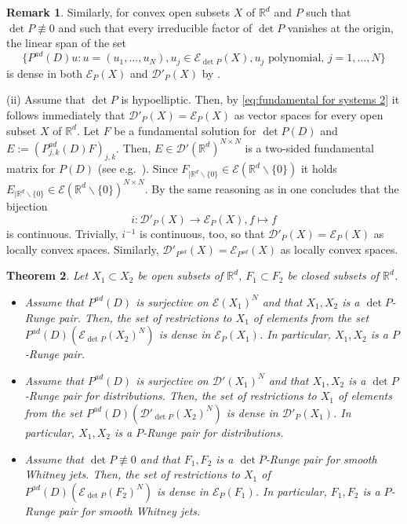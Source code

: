 \documentclass[a4paper,10pt]{amsart}
\newtheorem{theorem}{Theorem}
\newtheorem*{crucial lemma}{Lemma \ref{lem:nice polynomial2}}
\theoremstyle{definition}
\newtheorem{remark}[theorem]{Remark}
\newcommand{\R}{\mathbb{R}}
\newcommand{\Pad}{P^{ad}}
\newcommand{\detP}{\operatorname{det}\!P}
\begin{document}
\begin{remark}
	Similarly, for convex open subsets $X$ of $\R^d$ and $P$ such that $\detP\not\equiv 0$ and such that every irreducible factor of $\detP$ vanishes at the origin, the linear span of the set
	\begin{equation}\label{eq:exponential solutions}
		\{\Pad(D)u \colon u=(u_1,\ldots,u_N), u_j\in\mathscr{E}_{\detP}(X), u_j\text{ polynomial, } j=1,\ldots, N \}
	\end{equation}
	is dense in both $\mathscr{E}_P(X)$ and $\mathscr{D}'_P(X)$ by \cite[Chapitre Premiere, \S 2, Th\'eor\`eme 2']{Malgrange1955}.
	
	(ii) Assume that $\detP$ is hypoelliptic. Then, by \eqref{eq:fundamental for systems 2} it follows immediately that $\mathscr{D}'_P(X)=\mathscr{E}_P(X)$ as vector spaces for every open subset $X$ of $\R^d$. Let $F$ be a fundamental solution for $\detP(D)$ and $E:=(\Pad_{j,k}(D)F)_{j,k}$. Then, $E\in\mathscr{D}'(\R^d)^{N\times N}$ is a two-sided fundamental matrix for $P(D)$ (see e.g.~\cite[Section 2.1]{OrtnerWagner2015}). Since $F_{|\R^d\backslash\{0\}}\in\mathscr{E}(\R^d\backslash\{0\})$ it holds $E_{|\R^d\backslash\{0\}}\in\mathscr{E}(\R^d\backslash\{0\})^{N\times N}$. By the same reasoning as in \cite[Proof of Theorem 4.4.2]{Hor1} one concludes that the bijection
	\[i:\mathscr{D}'_P(X)\rightarrow\mathscr{E}_P(X), f\mapsto f\]
	is continuous. Trivially, $i^{-1}$ is continuous, too, so that $\mathscr{D}'_P(X)=\mathscr{E}_P(X)$ as locally convex spaces. Similarly, $\mathscr{D}'_{\Pad}(X)=\mathscr{E}_{\Pad}(X)$ as locally convex spaces.
\end{remark}

\begin{theorem}\label{theo:Runge for systems}
	Let $X_1\subset X_2$ be open subsets of $\R^d$, $F_1\subset F_2$ be closed subsets of $\R^d$.
	\begin{itemize}
		\item[(i)] Assume that $\Pad(D)$ is surjective on $\mathscr{E}(X_1)^N$ and that $X_1,X_2$ is a $\detP$-Runge pair. Then, the set of restrictions to $X_1$ of elements from the set $\Pad(D)\left(\mathscr{E}_{\detP}(X_2)^N\right)$ is dense in $\mathscr{E}_P(X_1)$. In particular, $X_1, X_2$ is a $P$-Runge pair.
		\item[(ii)] Assume that $\Pad(D)$ is surjective on $\mathscr{D}'(X_1)^N$ and that $X_1,X_2$ is a $\detP$-Runge pair for distributions. Then, the set of restrictions to $X_1$ of elements from the set $\Pad(D)\left(\mathscr{D}'_{\detP}(X_2)^N\right)$ is dense in $\mathscr{D}'_P(X_1)$. In particular, $X_1, X_2$ is a $P$-Runge pair for distributions.
		\item[(iii)] Assume that $\detP\not\equiv 0$ and that $F_1, F_2$ is a $\detP$-Runge pair for smooth Whitney jets. Then, the set of restrictions to $X_1$ of $\Pad(D)\left(\mathscr{E}_{\detP}(F_2)^N\right)$ is dense in $\mathscr{E}_P(F_1)$. In particular, $F_1, F_2$ is a $P$-Runge pair for smooth Whitney jets.
	\end{itemize}
\end{theorem}
\end{document}
